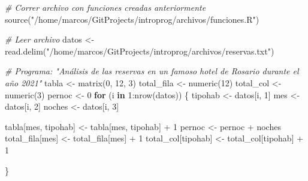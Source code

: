 \documentclass[
]{book}
\newenvironment{Shaded}{\begin{snugshade}}{\end{snugshade}}
\newcommand{\CommentTok}[1]{\textcolor[rgb]{0.56,0.35,0.01}{\textit{#1}}}
\newcommand{\ControlFlowTok}[1]{\textcolor[rgb]{0.13,0.29,0.53}{\textbf{#1}}}
\newcommand{\DecValTok}[1]{\textcolor[rgb]{0.00,0.00,0.81}{#1}}
\newcommand{\FunctionTok}[1]{\textcolor[rgb]{0.00,0.00,0.00}{#1}}
\newcommand{\NormalTok}[1]{#1}
\newcommand{\OtherTok}[1]{\textcolor[rgb]{0.56,0.35,0.01}{#1}}
\newcommand{\SpecialCharTok}[1]{\textcolor[rgb]{0.00,0.00,0.00}{#1}}
\newcommand{\StringTok}[1]{\textcolor[rgb]{0.31,0.60,0.02}{#1}}
\begin{document}
\begin{Shaded}
\begin{Highlighting}[]
\CommentTok{\# Correr archivo con funciones creadas anteriormente}
\FunctionTok{source}\NormalTok{(}\StringTok{"/home/marcos/GitProjects/introprog/archivos/funciones.R"}\NormalTok{)}

\CommentTok{\# Leer archivo}
\NormalTok{datos }\OtherTok{\textless{}{-}} \FunctionTok{read.delim}\NormalTok{(}\StringTok{"/home/marcos/GitProjects/introprog/archivos/reservas.txt"}\NormalTok{)}

\CommentTok{\# Programa: "Análisis de las reservas en un famoso hotel de Rosario durante el año 2021"}
\NormalTok{tabla }\OtherTok{\textless{}{-}} \FunctionTok{matrix}\NormalTok{(}\DecValTok{0}\NormalTok{, }\DecValTok{12}\NormalTok{, }\DecValTok{3}\NormalTok{)}
\NormalTok{total\_fila }\OtherTok{\textless{}{-}} \FunctionTok{numeric}\NormalTok{(}\DecValTok{12}\NormalTok{)}
\NormalTok{total\_col }\OtherTok{\textless{}{-}} \FunctionTok{numeric}\NormalTok{(}\DecValTok{3}\NormalTok{)}
\NormalTok{pernoc }\OtherTok{\textless{}{-}} \DecValTok{0}
\ControlFlowTok{for}\NormalTok{ (i }\ControlFlowTok{in} \DecValTok{1}\SpecialCharTok{:}\FunctionTok{nrow}\NormalTok{(datos)) \{}
\NormalTok{    tipohab }\OtherTok{\textless{}{-}}\NormalTok{ datos[i, }\DecValTok{1}\NormalTok{]}
\NormalTok{    mes }\OtherTok{\textless{}{-}}\NormalTok{ datos[i, }\DecValTok{2}\NormalTok{]}
\NormalTok{    noches }\OtherTok{\textless{}{-}}\NormalTok{ datos[i, }\DecValTok{3}\NormalTok{]}
    
\NormalTok{    tabla[mes, tipohab] }\OtherTok{\textless{}{-}}\NormalTok{ tabla[mes, tipohab] }\SpecialCharTok{+} \DecValTok{1}
\NormalTok{    pernoc }\OtherTok{\textless{}{-}}\NormalTok{ pernoc }\SpecialCharTok{+}\NormalTok{ noches}
\NormalTok{    total\_fila[mes] }\OtherTok{\textless{}{-}}\NormalTok{ total\_fila[mes] }\SpecialCharTok{+} \DecValTok{1}
\NormalTok{    total\_col[tipohab] }\OtherTok{\textless{}{-}}\NormalTok{ total\_col[tipohab] }\SpecialCharTok{+} \DecValTok{1}
    
\NormalTok{\}}


\end{Highlighting}
\end{Shaded}
\end{document}
